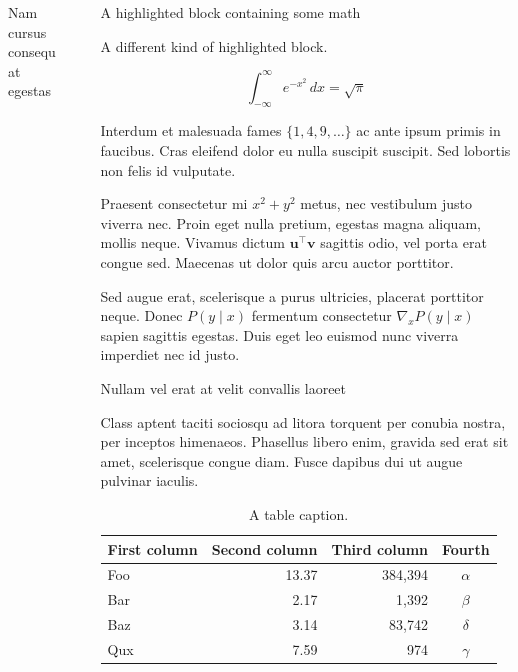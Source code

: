 \documentclass[final]{beamer}
\newlength{\sepwidth}
\newlength{\colwidth}
\newcommand{\separatorcolumn}{\begin{column}{\sepwidth}\end{column}}
\begin{document}
\begin{frame}[t]
\begin{columns}[t]
\begin{column}{\colwidth}
\begin{block}{Nam cursus consequat egestas}
  \end{block}

\end{column}

\separatorcolumn

\begin{column}{\colwidth}

  \begin{exampleblock}{A highlighted block containing some math}

    A different kind of highlighted block.

    $$
    \int_{-\infty}^{\infty} e^{-x^2}\,dx = \sqrt{\pi}
    $$

    Interdum et malesuada fames $\{1, 4, 9, \ldots\}$ ac ante ipsum primis in
    faucibus. Cras eleifend dolor eu nulla suscipit suscipit. Sed lobortis non
    felis id vulputate.


    Praesent consectetur mi $x^2 + y^2$ metus, nec vestibulum justo viverra
    nec. Proin eget nulla pretium, egestas magna aliquam, mollis neque. Vivamus
    dictum $\mathbf{u}^\intercal\mathbf{v}$ sagittis odio, vel porta erat
    congue sed. Maecenas ut dolor quis arcu auctor porttitor.


    Sed augue erat, scelerisque a purus ultricies, placerat porttitor neque.
    Donec $P(y \mid x)$ fermentum consectetur $\nabla_x P(y \mid x)$ sapien
    sagittis egestas. Duis eget leo euismod nunc viverra imperdiet nec id
    justo.

  \end{exampleblock}

  \begin{block}{Nullam vel erat at velit convallis laoreet}

    Class aptent taciti sociosqu ad litora torquent per conubia nostra, per
    inceptos himenaeos. Phasellus libero enim, gravida sed erat sit amet,
    scelerisque congue diam. Fusce dapibus dui ut augue pulvinar iaculis.

    \begin{table}
      \centering
      \begin{tabular}{l r r c}
        \toprule
        \textbf{First column} & \textbf{Second column} & \textbf{Third column} & \textbf{Fourth} \\
        \midrule
        Foo & 13.37 & 384,394 & $\alpha$ \\
        Bar & 2.17 & 1,392 & $\beta$ \\
        Baz & 3.14 & 83,742 & $\delta$ \\
        Qux & 7.59 & 974 & $\gamma$ \\
        \bottomrule
      \end{tabular}
      \caption{A table caption.}
    \end{table}


\end{block}
\end{column}
\end{columns}
\end{frame}
\end{document}
